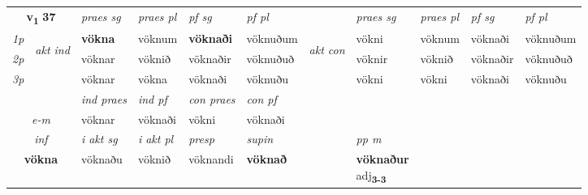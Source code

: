 \noindent
\begin{tabular}{lllllllllll} \toprule
\multicolumn{2}{c}{\textbf{v{\textsubscript{1}}} \Large{\textbf{37}}}  &  \textit{praes sg}  & \textit{praes pl}  &\textit{ pf sg} & \textit{pf pl} &  &  \textit{praes sg}  & \textit{praes pl}  & \textit{pf sg} & \textit{pf pl } \\*
	\cmidrule{3-6} \cmidrule{8-11}
 {\textit{1p}} & \multirow{3}{*}{\begin{turn}{90}\textit{akt ind}\end{turn}} & \textbf{vökna} & vöknum & \textbf{vöknaði} & vöknuðum & \multirow{3}{*}{\begin{turn}{90}\textit{akt con}\end{turn}} &vökni & vöknum & vöknaði & vöknuðum\\*
 {\textit{2p}} &  &  vöknar  & vöknið & vöknaðir & vöknuðuð & & vöknir & vöknið & vöknaðir & vöknuðuð \\*
{\textit{3p}} &  & vöknar & vökna & vöknaði & vöknuðu & & vökni & vökni& vöknaði & vöknuðu \\*
\cmidrule{3-6} \cmidrule{8-11}

   & &  \textit{ind praes} & \textit{ind pf} & \textit{con praes} & \textit{con pf} \\*
\multicolumn{2}{c}{ \textit{e-m} } & vöknar & vöknaði & vökni & vöknaði \\*

\cmidrule{3-8}
   \multicolumn{2}{c}{\textit{inf}}  & \textit{i akt sg} & \textit{i akt pl}   & \textit{presp} & \textit{supin}  && \textit{pp m} \\*
  \multicolumn{2}{c}{\textbf{vökna}} & vöknaðu  & vöknið   & vöknandi &  \textbf{vöknað}  && \specialcell{\textbf{vöknaður} \\ adj\textbf{\textsubscript{3-3}}} \\*
\end{tabular}

